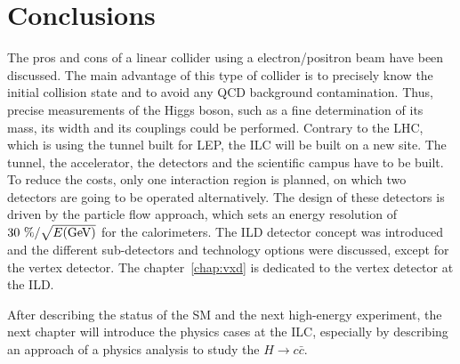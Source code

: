    \section{Conclusions}

   The pros and cons of a linear collider using a electron/positron beam have been discussed. 
   The main advantage of this type of collider is to precisely know the initial collision state and to avoid any \gls{QCD} background contamination.
   Thus, precise measurements of the Higgs boson, such as a fine determination of its mass, its width and its couplings could be performed.
   Contrary to the \gls{LHC}, which is using the tunnel built for \gls{LEP}, the \gls{ILC} will be built on a new site.
   The tunnel, the accelerator, the detectors and the scientific campus have to be built. 
   To reduce the costs, only one interaction region is planned, on which two detectors are going to be operated alternatively.
   The design of these detectors is driven by the particle flow approach, which sets an energy resolution of $30~\%/\sqrt{E\rm{(GeV)}}$ for the calorimeters.
   The \gls{ILD} detector concept was introduced and the different sub-detectors and technology options were discussed, except for the vertex detector.
   The chapter~\ref{chap:vxd} is dedicated to the vertex detector at the \gls{ILD}.
   
   After describing the status of the \gls{SM} and the next high-energy experiment, the next chapter will introduce the physics cases at the \gls{ILC}, especially by describing an approach of a physics analysis to study the $H \rightarrow c\bar{c}$.

